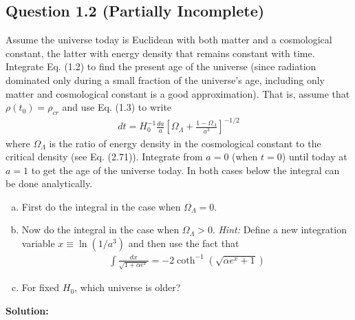 \documentclass[11pt]{article}
\begin{document}
\subsection{Question 1.2 (Partially Incomplete)}
Assume the universe today is Euclidean with both matter and a cosmological constant, the latter with energy density that remains constant with time. Integrate Eq. (1.2) to find the present age of the universe (since radiation dominated only during a small fraction of the universe's age, including only matter and cosmological constant is a good approximation). That is, assume that $\rho(t_0) = \rho_{cr}$ and use Eq. (1.3) to write 
\begin{align*}
    dt = H^{-1}_0 \frac{da}{a} \left[ \Omega_\Lambda + \frac{1 - \Omega_\Lambda}{a^3}\right]^{-1/2}
\end{align*}
where $\Omega_\Lambda$ is the ratio of energy density in the cosmological constant to the critical density (see Eq. (2.71)). Integrate from $a=0$ (when $t=0$) until today at $a = 1$ to get the age of the universe today. In both cases below the integral can be done analytically. 
\begin{enumerate} [(a)]
    \item First do the integral in the case when $\Omega_\Lambda = 0$. 
    \item Now do the integral in the case when $\Omega_\Lambda> 0$. \textit{Hint:} Define a new integration variable $x \equiv \ln(1/a^3)$ and then use the fact that 
    \begin{align*}
        \int \frac{dx}{\sqrt{1 + \alpha e^x}} = -2 \coth^{-1}(\sqrt{\alpha e^x + 1})
    \end{align*}
    \item For fixed $H_0$, which universe is older?
\end{enumerate}

\textbf{Solution:}
\end{document}

